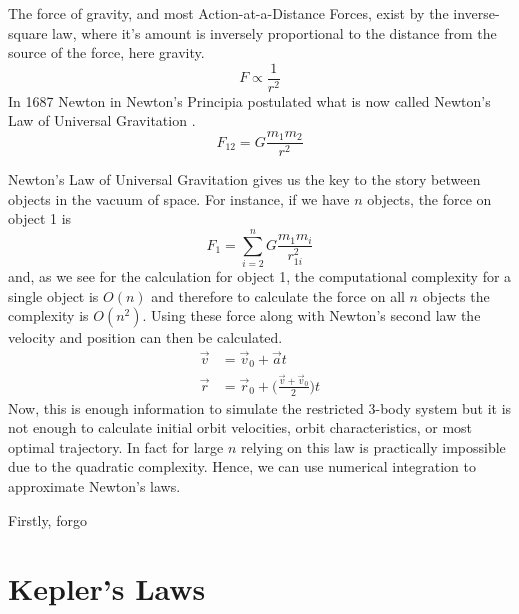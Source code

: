 \documentclass{article}
\begin{document}
The force of gravity, and most Action-at-a-Distance Forces, exist by the inverse-square law, where it's amount is inversely proportional to the distance from the source of the force, here gravity. $$F\propto \frac{1}{r^2}$$ In 1687 Newton in Newton's Principia postulated what is now called Newton's Law of Universal Gravitation \cite{rohrlich_1999}. $$F_{12}=G\frac{m_1m_2}{r^2}$$

Newton's Law of Universal Gravitation gives us the key to the story between objects in the vacuum of space. For instance, if we have $n$ objects, the force on object 1 is $$F_1=\sum_{i=2}^n{G\frac{m_1 m_i}{r_{1i}^2}}$$ and, as we see for the calculation for object 1, the computational complexity for a single object is $O(n)$ and therefore to calculate the force on all $n$ objects the complexity is $O(n^2)$. Using these force along with Newton's second law the velocity and position can then be calculated.
\begin{align*}
	\vec{v} &= \vec{v}_0+\vec{a}t\\
	\vec{r} &= \vec{r}_0+\bigg(\frac{\vec{v}+\vec{v}_0}{2}\bigg)t
\end{align*}
Now, this is enough information to simulate the restricted 3-body system but it is not enough to calculate initial orbit velocities, orbit characteristics, or most optimal trajectory. In fact for large $n$ relying on this law is practically impossible due to the quadratic complexity. Hence, we can use numerical integration to approximate Newton's laws.

Firstly, forgo 

\section{Kepler's Laws}
\end{document}
